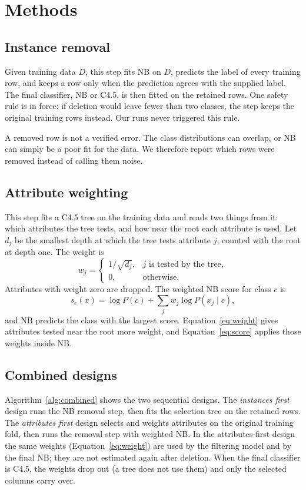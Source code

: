 \documentclass[conference]{IEEEtran}
\begin{document}
\section{Methods}
\subsection{Instance removal}
Given training data $D$, this step fits NB on $D$, predicts the label of every
training row, and keeps a row only when the prediction agrees with the supplied
label. The final classifier, NB or C4.5, is then fitted on the retained rows.
One safety rule is in force: if deletion would leave fewer than two classes,
the step keeps the original training rows instead. Our runs never triggered
this rule.

A removed row is not a verified error. The class distributions can overlap, or
NB can simply be a poor fit for the data. We therefore report which rows were
removed instead of calling them noise.

\subsection{Attribute weighting}
This step fits a C4.5 tree on the training data and reads two things from it:
which attributes the tree tests, and how near the root each attribute is used.
Let $d_j$ be the smallest depth at which the tree tests attribute $j$, counted
with the root at depth one. The weight is
\begin{equation}
\label{eq:weight}
 w_j = \begin{cases}1/\sqrt{d_j}, & j\text{ is tested by the tree},\\
                    0, & \text{otherwise}.\end{cases}
\end{equation}
Attributes with weight zero are dropped. The weighted NB score for class $c$ is
\begin{equation}
\label{eq:score}
 s_c(x)=\log P(c)+\sum_{j}w_j\log P(x_j\mid c),
\end{equation}
and NB predicts the class with the largest score. Equation~\eqref{eq:weight}
gives attributes tested near the root more weight, and
Equation~\eqref{eq:score} applies those weights inside NB.

\subsection{Combined designs}
Algorithm~\ref{alg:combined} shows the two sequential designs. The
\emph{instances first} design runs the NB removal step, then fits the selection
tree on the retained rows. The \emph{attributes first} design selects and
weights attributes on the original training fold, then runs the removal step
with weighted NB. In the attributes-first design the same weights
(Equation~\eqref{eq:weight}) are used by the filtering model and by the final
NB; they are not estimated again after deletion. When the final classifier is
C4.5, the weights drop out (a tree does not use them) and only the selected
columns carry over.
\end{document}
